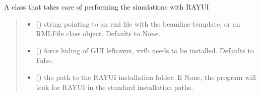 \documentclass[letterpaper,10pt,english]{sphinxmanual}
\begin{document}
\begin{fulllineitems}
\label{\detokenize{API:raypyng.simulate.Simulate}}
\pysigstartsignatures
\pysiglinewithargsret
{}
{\sphinxparamcomma {}\sphinxparamcomma {}\sphinxparamcomma {}}
{}
\pysigstopsignatures
\sphinxAtStartPar
A class that takes care of performing the simulations with RAY\sphinxhyphen{}UI
\begin{quote}\begin{description}
\begin{itemize}
\item {} 
\sphinxAtStartPar
{} (\sphinxstyleliteralemphasis{\sphinxupquote{, }}) \textendash{} string pointing to an rml file with
the beamline template, or an RMLFile
class object. Defaults to None.

\item {} 
\sphinxAtStartPar
{} (\sphinxstyleliteralemphasis{\sphinxupquote{, }}) \textendash{} force hiding of GUI leftovers, xvfb needs
to be installed. Defaults to False.

\item {} 
\sphinxAtStartPar
{} (\sphinxstyleliteralemphasis{\sphinxupquote{, }}) \textendash{} the path to the RAY\sphinxhyphen{}UI installation folder.
If None, the program will look for RAY\sphinxhyphen{}UI in
the standard installation paths.

\end{itemize}

\end{description}\end{quote}


\end{fulllineitems}
\end{document}
